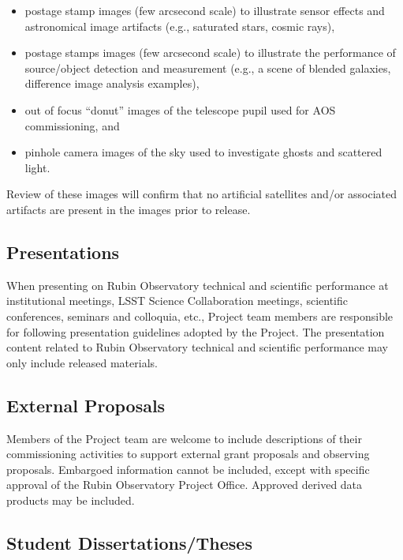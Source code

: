 \documentclass[SE,authoryear,toc]{lsstdoc}
\begin{document}
\begin{itemize}

  \item postage stamp images (few arcsecond scale) to illustrate sensor effects and astronomical image artifacts (e.g., saturated stars, cosmic rays),

  \item postage stamps images (few arcsecond scale) to illustrate the performance of source/object detection and measurement (e.g., a scene of blended galaxies, difference image analysis examples),

  \item out of focus ``donut'' images of the telescope pupil used for AOS commissioning, and

  \item pinhole camera images of the sky used to investigate ghosts and scattered light.

\end{itemize}

Review of these images will confirm that no artificial satellites and/or associated artifacts are present in the images prior to release.

\subsection{Presentations}

When presenting on Rubin Observatory technical and scientific performance at institutional meetings, LSST Science Collaboration meetings, scientific conferences, seminars and colloquia, etc., Project team members are responsible for following presentation guidelines adopted by the Project.
The presentation content related to Rubin Observatory technical and scientific performance may only include released materials.

\subsection{External Proposals}

Members of the Project team are welcome to include descriptions of their commissioning activities to support external grant proposals and observing proposals.
Embargoed information cannot be included, except with specific approval of the Rubin Observatory Project Office.
Approved derived data products may be included.

\subsection{Student Dissertations/Theses}
\end{document}
